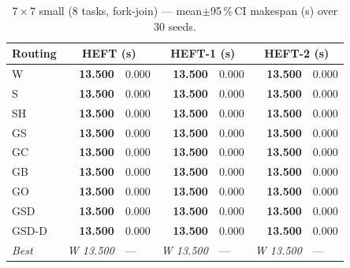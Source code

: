 \documentclass[11pt]{article}
\newcommand{\win}[1]{\textcolor{green!50!black}{\textbf{#1}}}
\begin{document}
\begin{table}[H]\centering\small
\begin{tabular}{l r@{$\pm$}l r@{$\pm$}l r@{$\pm$}l}
\toprule
\textbf{Routing} & \multicolumn{2}{c}{\textbf{HEFT (s)}} & \multicolumn{2}{c}{\textbf{HEFT-1 (s)}} & \multicolumn{2}{c}{\textbf{HEFT-2 (s)}} \\
\midrule
  W & \win{13.500} & 0.000 & \win{13.500} & 0.000 & \win{13.500} & 0.000 \\
  S & \win{13.500} & 0.000 & \win{13.500} & 0.000 & \win{13.500} & 0.000 \\
  SH & \win{13.500} & 0.000 & \win{13.500} & 0.000 & \win{13.500} & 0.000 \\
  GS & \win{13.500} & 0.000 & \win{13.500} & 0.000 & \win{13.500} & 0.000 \\
  GC & \win{13.500} & 0.000 & \win{13.500} & 0.000 & \win{13.500} & 0.000 \\
  GB & \win{13.500} & 0.000 & \win{13.500} & 0.000 & \win{13.500} & 0.000 \\
  GO & \win{13.500} & 0.000 & \win{13.500} & 0.000 & \win{13.500} & 0.000 \\
  GSD & \win{13.500} & 0.000 & \win{13.500} & 0.000 & \win{13.500} & 0.000 \\
  GSD-D & \win{13.500} & 0.000 & \win{13.500} & 0.000 & \win{13.500} & 0.000 \\
\midrule
  \textit{Best} & \textit{W 13.500} & --- & \textit{W 13.500} & --- & \textit{W 13.500} & --- \\
\bottomrule\end{tabular}
\caption{$7\times7$ small (8 tasks, fork-join) --- mean$\pm$95\,\%\,CI makespan (s) over 30 seeds.}
\end{table}
\end{document}
